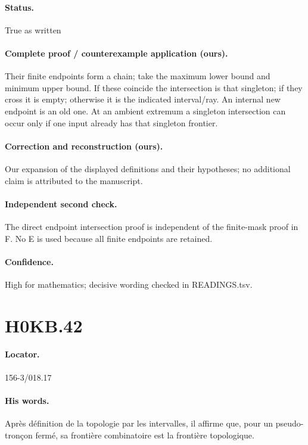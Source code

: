 \paragraph{Status.} True as written

\paragraph{Complete proof / counterexample application (ours).} Their finite endpoints form a chain; take the maximum lower bound and minimum upper bound. If these coincide the intersection is that singleton; if they cross it is empty; otherwise it is the indicated interval/ray. An internal new endpoint is an old one. At an ambient extremum a singleton intersection can occur only if one input already has that singleton frontier.

\paragraph{Correction and reconstruction (ours).} Our expansion of the displayed definitions and their hypotheses; no additional claim is attributed to the manuscript.

\paragraph{Independent second check.} The direct endpoint intersection proof is independent of the finite-mask proof in F. No E is used because all finite endpoints are retained.

\paragraph{Confidence.} High for mathematics; decisive wording checked in READINGS.tsv.

\section*{H0KB.42}\label{statement:H0KB.42}
\paragraph{Locator.} 156-3/018.17

\paragraph{His words.} Après définition de la topologie par les intervalles, il affirme que, pour un pseudo-tronçon fermé, sa frontière combinatoire est la frontière topologique.


